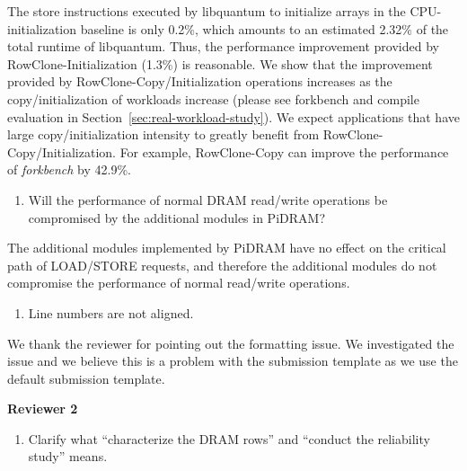 The store instructions executed by libquantum to initialize arrays in the CPU-initialization baseline is only 0.2\%, which amounts to an estimated 2.32\% of the total runtime of libquantum. Thus, the performance improvement provided by RowClone-Initialization (1.3\%) is reasonable. We show that the improvement provided by RowClone-Copy/Initialization operations increases as the copy/initialization of workloads increase (please see forkbench and compile evaluation in Section~\ref{sec:real-workload-study}). We expect applications that have large copy/initialization intensity to greatly benefit from RowClone-Copy/Initialization. For example, RowClone-Copy can improve the performance of \emph{forkbench} by 42.9\%.

\bigbreak
\begin{tcolorbox}
    \begin{enumerate}[label=R1/\arabic*]
        \addtocounter{enumi}{5}
        \item \label{q:r1q6} Will the performance of normal DRAM read/write operations be compromised by the additional modules in PiDRAM?
    \end{enumerate}
\end{tcolorbox} 

The additional modules implemented by PiDRAM have no effect on the critical path of LOAD/STORE requests, and therefore the additional modules do not compromise the performance of normal read/write operations. 


\bigbreak
\begin{tcolorbox}
    \begin{enumerate}[label=R1/\arabic*]
        \addtocounter{enumi}{6}
        \item \label{q:r1q7} Line numbers are not aligned.
    \end{enumerate}
\end{tcolorbox} 

We thank the reviewer for pointing out the formatting issue. We investigated the issue and we believe this is a problem with the submission template as we use the default submission template.


\newpage

\noindent \textbf{\large{Reviewer 2}}

\bigbreak
\begin{tcolorbox}
    \begin{enumerate}[label=R2/\arabic*]
        \item \label{q:r2q1} Clarify what ``characterize the DRAM rows'' and ``conduct the reliability study'' means. 
    \end{enumerate}
\end{tcolorbox} 

